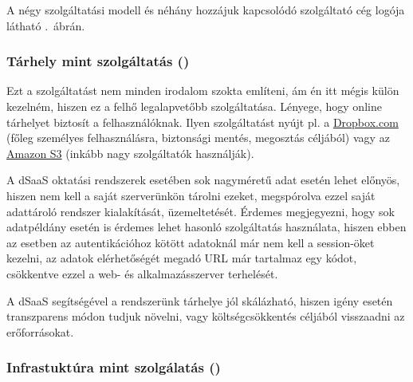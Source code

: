 A négy szolgáltatási modell és néhány hozzájuk kapcsolódó szolgáltató cég logója látható .~ábrán.
 
\subsubsection{Tárhely mint szolgáltatás ()}
Ezt a szolgáltatást nem minden irodalom szokta említeni, ám én itt mégis külön kezelném, hiszen ez a felhő legalapvetőbb szolgáltatása. Lényege, hogy online tárhelyet biztosít a felhasználóknak. Ilyen szolgáltatást nyújt pl. a \href{http://www.dropbox.com}{Dropbox.com} (főleg személyes felhasználásra, biztonsági mentés, megosztás céljából) vagy az \href{https://aws.amazon.com/s3/}{Amazon S3} (inkább nagy szolgáltatók használják).

A dSaaS oktatási rendszerek esetében sok nagyméretű adat esetén lehet előnyös, hiszen nem kell a saját szerverünkön tárolni ezeket, megspórolva ezzel saját adattároló rendszer kialakítását, üzemeltetését. Érdemes megjegyezni, hogy sok adatpéldány esetén is érdemes lehet hasonló szolgáltatás használata, hiszen ebben az esetben az autentikációhoz kötött adatoknál már nem kell a session-öket kezelni, az adatok elérhetőségét megadó URL már tartalmaz egy kódot, csökkentve ezzel a web- és alkalmazásszerver terhelését. 

A dSaaS segítségével a rendszerünk tárhelye jól skálázható, hiszen igény esetén transzparens módon tudjuk növelni, vagy költségcsökkentés céljából visszaadni az erőforrásokat. 

\subsubsection{Infrastuktúra mint szolgálatás ()}

